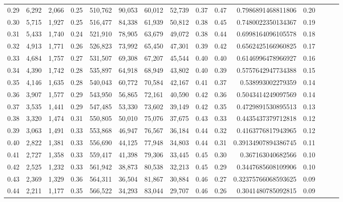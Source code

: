 \begin{tabular}{rrrrrrrrrrrrrrr}
0.29 &   6,292 &  2,066 &  0.25 &  510,762 &   90,053 &   60,012 &   52,739 &  0.37 &  0.47 &     0.7986891468811806 &      0.20 \\
0.30 &   5,715 &  1,927 &  0.25 &  516,477 &   84,338 &   61,939 &   50,812 &  0.38 &  0.45 &     0.7480022350134367 &      0.19 \\
0.31 &   5,433 &  1,740 &  0.24 &  521,910 &   78,905 &   63,679 &   49,072 &  0.38 &  0.44 &     0.6998164096105578 &      0.18 \\
0.32 &   4,913 &  1,771 &  0.26 &  526,823 &   73,992 &   65,450 &   47,301 &  0.39 &  0.42 &     0.6562425166960825 &      0.17 \\
0.33 &   4,684 &  1,757 &  0.27 &  531,507 &   69,308 &   67,207 &   45,544 &  0.40 &  0.40 &     0.6146996478966927 &      0.16 \\
0.34 &   4,390 &  1,742 &  0.28 &  535,897 &   64,918 &   68,949 &   43,802 &  0.40 &  0.39 &     0.5757642947734388 &      0.15 \\
0.35 &   4,146 &  1,635 &  0.28 &  540,043 &   60,772 &   70,584 &   42,167 &  0.41 &  0.37 &      0.538993002279359 &      0.14 \\
0.36 &   3,907 &  1,577 &  0.29 &  543,950 &   56,865 &   72,161 &   40,590 &  0.42 &  0.36 &     0.5043414249097569 &      0.14 \\
0.37 &   3,535 &  1,441 &  0.29 &  547,485 &   53,330 &   73,602 &   39,149 &  0.42 &  0.35 &     0.4729891530895513 &      0.13 \\
0.38 &   3,320 &  1,474 &  0.31 &  550,805 &   50,010 &   75,076 &   37,675 &  0.43 &  0.33 &     0.4435437379712818 &      0.12 \\
0.39 &   3,063 &  1,491 &  0.33 &  553,868 &   46,947 &   76,567 &   36,184 &  0.44 &  0.32 &     0.4163776817943965 &      0.12 \\
0.40 &   2,822 &  1,381 &  0.33 &  556,690 &   44,125 &   77,948 &   34,803 &  0.44 &  0.31 &    0.39134907894386745 &      0.11 \\
0.41 &   2,727 &  1,358 &  0.33 &  559,417 &   41,398 &   79,306 &   33,445 &  0.45 &  0.30 &      0.367163040682566 &      0.10 \\
0.42 &   2,525 &  1,232 &  0.33 &  561,942 &   38,873 &   80,538 &   32,213 &  0.45 &  0.29 &     0.3447685608109906 &      0.10 \\
0.43 &   2,369 &  1,329 &  0.36 &  564,311 &   36,504 &   81,867 &   30,884 &  0.46 &  0.27 &    0.32375766068593625 &      0.09 \\
0.44 &   2,211 &  1,177 &  0.35 &  566,522 &   34,293 &   83,044 &   29,707 &  0.46 &  0.26 &     0.3041480785092815 &      0.09 \\

\end{tabular}
